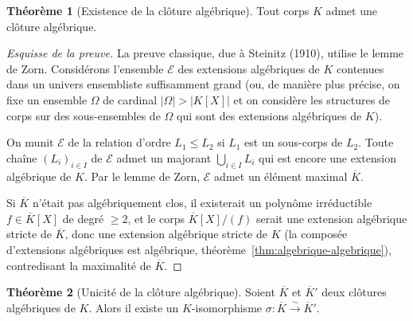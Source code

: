 \documentclass[12pt,a4paper,openany]{book}
\theoremstyle{definition}
\newtheorem{theoreme}{Théorème}[chapter]
\begin{document}
\begin{theoreme}[Existence de la clôture algébrique]\label{thm:existence-cloture}
Tout corps $K$ admet une clôture algébrique.
\end{theoreme}

\begin{proof}[Esquisse de la preuve]
La preuve classique, due à Steinitz (1910), utilise le lemme de Zorn. Considérons
l'ensemble $\mathcal{E}$ des extensions algébriques de $K$ contenues dans un
univers ensembliste suffisamment grand (ou, de manière plus précise, on fixe un
ensemble $\Omega$ de cardinal $|\Omega| > |K[X]|$ et on considère les structures
de corps sur des sous-ensembles de $\Omega$ qui sont des extensions algébriques
de $K$).

On munit $\mathcal{E}$ de la relation d'ordre $L_1 \leq L_2$ si $L_1$ est un
sous-corps de $L_2$. Toute chaîne $(L_i)_{i \in I}$ de $\mathcal{E}$ admet un
majorant $\bigcup_{i \in I} L_i$ qui est encore une extension algébrique de $K$.
Par le lemme de Zorn, $\mathcal{E}$ admet un élément maximal $\overline{K}$.

Si $\overline{K}$ n'était pas algébriquement clos, il existerait un polynôme
irréductible $f \in \overline{K}[X]$ de degré $\geq 2$, et le corps
$\overline{K}[X]/(f)$ serait une extension algébrique stricte de $\overline{K}$,
donc une extension algébrique stricte de $K$ (la composée d'extensions algébriques
est algébrique, théorème~\ref{thm:algebrique-algebrique}), contredisant la
maximalité de $\overline{K}$.
\end{proof}

\begin{theoreme}[Unicité de la clôture algébrique]\label{thm:unicite-cloture}
Soient $\overline{K}$ et $\overline{K}'$ deux clôtures algébriques de $K$.
Alors il existe un $K$-isomorphisme
$\sigma \colon \overline{K} \xrightarrow{\sim} \overline{K}'$.
\end{theoreme}
\end{document}
